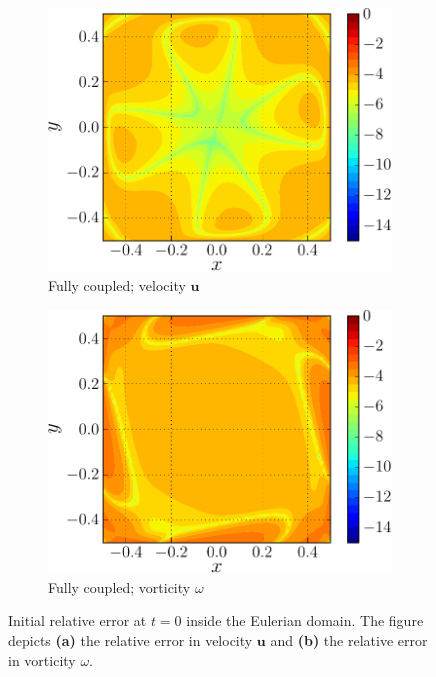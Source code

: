 \begin{figure}[h]
     \begin{subfigure}[t]{0.45\textwidth}
             \includegraphics[width=\linewidth]{./figures/hybrid/lambOseent2/lambOseen_fully_vErrorFinal_compressed-crop.pdf}
             \caption{Fully coupled; velocity $\mathbf{u}$}
             \label{fig:lambOseen_fully_vErrorFinal}
     \end{subfigure}     
     \qquad
     \begin{subfigure}[t]{0.45\textwidth}
             \includegraphics[width=\linewidth]{./figures/hybrid/lambOseent2/lambOseen_fully_wErrorFinal_compressed-crop.pdf}
             \caption{Fully coupled; vorticity $\omega$}
             \label{fig:lambOseen_fully_wErrorFinal}
     \end{subfigure}        
     
     \caption{Initial relative error at $t=0$ inside the Eulerian domain. The figure depicts \textbf{(a)} the relative error in velocity $\mathbf{u}$ and \textbf{(b)} the relative error in vorticity $\omega$.}
     \label{fig:lambOseen_finalError}
	\end{figure}	


